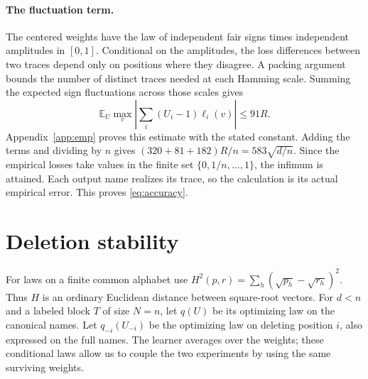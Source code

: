 \documentclass[11pt]{article}
\theoremstyle{definition}\newtheorem{definition}[theorem]{Definition}
\newcommand{\E}{\mathbb E}
\begin{document}
\paragraph{The fluctuation term.}
The centered weights have the law of independent fair signs times independent
amplitudes in $[0,1]$. Conditional on the amplitudes, the loss differences
between two traces depend only on positions where they disagree. A packing
argument bounds the number of distinct traces needed at each Hamming scale.
Summing the expected sign fluctuations across those scales gives
\[
 \E_U\max_v\left|\sum_i(U_i-1)\ell_i(v)\right|\le91R .
\]
Appendix~\ref{app:emp} proves this estimate with the stated constant. Adding
the terms and dividing by $n$ gives $(320+81+182)R/n=583\sqrt{d/n}$.
Since the empirical losses take values in the finite set $\{0,1/n,\ldots,1\}$, the infimum is attained. Each output name realizes its trace, so the calculation is its actual
empirical error. This proves \eqref{eq:accuracy}.

\section{Deletion stability}\label{sec:stability}
For laws on a finite common alphabet use
$H^2(p,r)=\sum_h(\sqrt{p_h}-\sqrt{r_h})^2$.
Thus $H$ is an ordinary Euclidean distance between square-root vectors.
For $d<n$ and a labeled block $T$ of size $N=n$, let $q(U)$ be its optimizing
law on the canonical names. Let $q_{-i}(U_{-i})$ be the optimizing law on
deleting position $i$, also expressed on the full names. The learner
averages over the weights; these conditional laws allow us to couple the
two experiments by using the same surviving weights.
\end{document}
